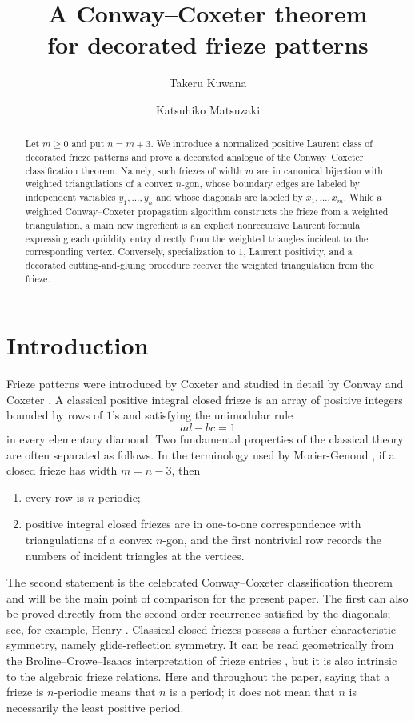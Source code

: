 \documentclass[amstex,11pt,reqno]{amsart}
\title[Conway--Coxeter theorem for decorated frieze]{A Conway--Coxeter theorem \\for decorated frieze patterns}
\author[T. Kuwana]{Takeru Kuwana}
\author[K. Matsuzaki]{Katsuhiko Matsuzaki}
\theoremstyle{definition}
\begin{document}
\begin{abstract}
Let $m\geq0$ and put $n=m+3$. We introduce a normalized positive Laurent class of decorated frieze patterns and prove a decorated analogue of the Conway--Coxeter classification theorem. Namely, such friezes of width $m$ are in canonical bijection with weighted triangulations of a convex $n$-gon, whose boundary edges are labeled by independent variables $y_1,\ldots,y_n$ and whose diagonals are labeled by $x_1,\ldots,x_m$. While a weighted Conway--Coxeter propagation algorithm constructs the frieze from a weighted triangulation, a main new ingredient is an explicit nonrecursive Laurent formula expressing each quiddity entry directly from the weighted triangles incident to the corresponding vertex. Conversely, specialization to $1$, Laurent positivity, and a decorated cutting-and-gluing procedure recover the weighted triangulation from the frieze. 
\end{abstract}

\maketitle

\section{Introduction}\label{sec:intro}

Frieze patterns were introduced by Coxeter \cite{Coxeter1971} and studied in detail by Conway and Coxeter \cite{CC1,CC2}. A classical positive integral closed frieze is an array of positive integers bounded by rows of $1$'s and satisfying the unimodular rule
\[
 ad-bc=1
\]
in every elementary diamond. Two fundamental properties of the classical theory are often separated as follows. In the terminology used by Morier-Genoud \cite{Morier2Friezes}, if a closed frieze has width $m=n-3$, then
\begin{enumerate}[label=\textup{(CC\arabic*)},leftmargin=3.7em]
\item every row is $n$-periodic;
\item positive integral closed friezes are in one-to-one correspondence with triangulations of a convex $n$-gon, and the first nontrivial row records the numbers of incident triangles at the vertices.
\end{enumerate}
The second statement is the celebrated Conway--Coxeter classification theorem and will be the main point of comparison for the present paper. The first can also be proved directly from the second-order recurrence satisfied by the diagonals; see, for example, Henry \cite{Henry2013}. Classical closed friezes possess a further characteristic symmetry, namely glide-reflection symmetry. It can be read geometrically from the Broline--Crowe--Isaacs interpretation of frieze entries \cite{BCI}, but it is also intrinsic to the algebraic frieze relations. Here and throughout the paper, saying that a frieze is $n$-periodic means that $n$ is a period; it does not mean that $n$ is necessarily the least positive period.
\end{document}

